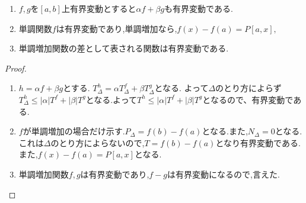 \begin{lem}
\begin{enumerate}
    \item $f,g$を$[a,b]$上有界変動とすると$\alpha f+ \beta g$も有界変動である.
    \item 単調関数$f$は有界変動であり,単調増加なら,$f(x) - f(a) = P[a, x],$ 
    \item 単調増加関数の差として表される関数は有界変動である.
\end{enumerate}
\end{lem}
\begin{proof}
\begin{enumerate}
\item $h = \alpha f + \beta g$とする. $T_{\Delta}^{h} = \alpha T_{\Delta}^f + \beta T_{\Delta}^g$となる.
よって$\Delta$のとり方によらず
$T_{\Delta}^{h} \le |\alpha| T^f + |\beta| T^g $となる.よって$T^h\le |\alpha| T^f + |\beta| T^g $となるので、有界変動である.

\item $f$が単調増加の場合だけ示す.$P_{\Delta} = f(b) - f(a)$となる.また,$N_{\Delta} = 0$となる.これは$\Delta$のとり方によらないので,$T= f(b) - f(a)$となり有界変動である.
また,$f(x) - f(a) = P[a,x]$となる.
\item 単調増加関数$f,g$は有界変動であり,$f-g$は有界変動になるので,言えた.
\end{enumerate}
\end{proof}

